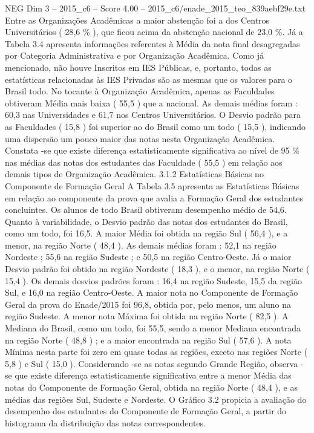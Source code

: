 \begin{textsample}{NEG Dim 3 – 2015\_c6 – Score 4.00 – 2015\_c6/enade\_2015\_teo\_839aebf29e.txt}
Entre as Organizações Acadêmicas a maior abstenção foi a dos Centros Universitários ( 28,6 \% ), que ficou acima da abstenção nacional de 23,0 \%.
Já a Tabela 3.4 apresenta informações referentes à Média da nota final desagregadas por Categoria Administrativa e por Organização Acadêmica.
Como já mencionado, não houve Inscritos em IES Públicas, e, portanto, todas as estatísticas relacionadas às IES Privadas são as mesmas que os valores para o Brasil todo.
No tocante à Organização Acadêmica, apenas as Faculdades obtiveram Média mais baixa ( 55,5 ) que a nacional.
As demais médias foram : 60,3 nas Universidades e 61,7 nos Centros Universitários.
O Desvio padrão para as Faculdades ( 15,8 ) foi superior ao do Brasil como um todo ( 15,5 ), indicando uma dispersão um pouco maior das notas nesta Organização Acadêmica.
Constata -se que existe diferença estatisticamente significativa ao nível de 95 \% nas médias das notas dos estudantes das Faculdade ( 55,5 ) em relação aos demais tipos de Organização Acadêmica. 3.1.2 Estatísticas Básicas no Componente de Formação Geral A Tabela 3.5 apresenta as Estatísticas Básicas em relação ao componente da prova que avalia a Formação Geral dos estudantes concluintes.
Os alunos de todo Brasil obtiveram desempenho médio de 54,6.
Quanto à variabilidade, o Desvio padrão das notas dos estudantes do Brasil, como um todo, foi 16,5.
A maior Média foi obtida na região Sul ( 56,4 ), e a menor, na região Norte ( 48,4 ).
As demais médias foram : 52,1 na região Nordeste ; 55,6 na região Sudeste ; e 50,5 na região Centro-Oeste.
Já o maior Desvio padrão foi obtido na região Nordeste ( 18,3 ), e o menor, na região Norte ( 15,4 ).
Os demais desvios padrões foram : 16,4 na região Sudeste, 15,5 da região Sul, e 16,0 na região Centro-Oeste.
A maior nota no Componente de Formação Geral da prova do Enade/2015 foi 96,8, obtida por, pelo menos, um aluno na região Sudeste.
A menor nota Máxima foi obtida na região Norte ( 82,5 ).
A Mediana do Brasil, como um todo, foi 55,5, sendo a menor Mediana encontrada na região Norte ( 48,8 ) ; e a maior encontrada na região Sul ( 57,6 ).
A nota Mínima nesta parte foi zero em quase todas as regiões, exceto nas regiões Norte ( 5,8 ) e Sul ( 15,0 ).
Considerando -se as notas segundo Grande Região, observa -se que existe diferença estatisticamente significativa entre a menor Média das notas do Componente de Formação Geral, obtida na região Norte ( 48,4 ), e as médias das regiões Sul, Sudeste e Nordeste.
O Gráfico 3.2 propicia a avaliação do desempenho dos estudantes do Componente de Formação Geral, a partir do histograma da distribuição das notas correspondentes.

\end{textsample}

